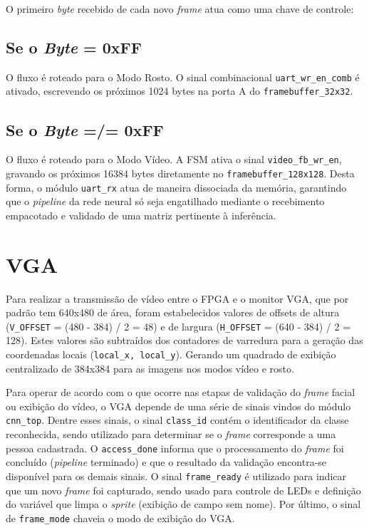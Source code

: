 O primeiro \textit{byte}  recebido de cada novo \textit{frame}  atua como uma chave de controle:
\subsection*{Se o \textit{Byte}  = 0xFF} O fluxo é roteado para o Modo Rosto. O sinal combinacional \texttt{uart\_wr\_en\_comb} é ativado, escrevendo os próximos 1024 bytes na porta A do \texttt{framebuffer\_32x32}.
\subsection*{Se o \textit{Byte}  =/= 0xFF} O fluxo é roteado para o Modo Vídeo. A FSM ativa o sinal \texttt{video\_fb\_wr\_en}, gravando os próximos 16384 bytes diretamente no \texttt{framebuffer\_128x128}.
Desta forma, o módulo \texttt{uart\_rx} atua de maneira dissociada da memória, garantindo que o \textit{pipeline}  da rede neural só seja engatilhado mediante o recebimento empacotado e validado de uma matriz pertinente à inferência.


\section{VGA}
Para realizar a transmissão de vídeo entre o FPGA e o monitor VGA, que por padrão tem 640x480 de área, foram estabelecidos valores de offsets de altura (\texttt{V\_OFFSET} = (480 - 384) / 2 = 48) e de largura (\texttt{H\_OFFSET} = (640 - 384) / 2 = 128). Estes valores são subtraídos dos contadores de varredura para a geração das coordenadas locais (\texttt{local\_x, local\_y}). Gerando um quadrado de exibição centralizado de 384x384 para as imagens nos modos vídeo e rosto.

Para operar de acordo com o que ocorre nas etapas de validação do \textit{frame}  facial ou exibição do vídeo, o VGA depende de uma série de sinais vindos do módulo \texttt{cnn\_top}. Dentre esses sinais, o sinal \texttt{class\_id} contém o identificador da classe reconhecida, sendo utilizado para determinar se o \textit{frame}  corresponde a uma pessoa cadastrada. O \texttt{access\_done} informa que o processamento do \textit{frame}  foi concluído (\textit{pipeline}  terminado) e que o resultado da validação encontra-se disponível para os demais sinais. O sinal \texttt{frame\_ready} é utilizado para indicar que um novo \textit{frame}  foi capturado, sendo usado para controle de LEDs e definição do variável que limpa o \textit{sprite}  (exibição de campo sem nome). Por último, o sinal de \texttt{frame\_mode} chaveia o modo de exibição do VGA. 

